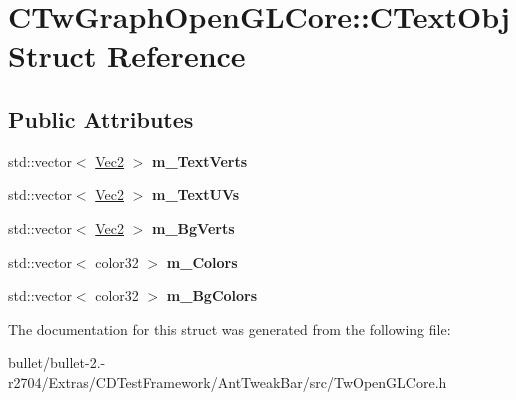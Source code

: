 \hypertarget{struct_c_tw_graph_open_g_l_core_1_1_c_text_obj}{\section{C\+Tw\+Graph\+Open\+G\+L\+Core\+:\+:C\+Text\+Obj Struct Reference}
\label{struct_c_tw_graph_open_g_l_core_1_1_c_text_obj}
}
\subsection*{Public Attributes}
\begin{DoxyCompactItemize}
\item 
\hypertarget{struct_c_tw_graph_open_g_l_core_1_1_c_text_obj_aa15c8ec456b38a1c9b9f0af69ea077cc}{std\+::vector$<$ \hyperlink{struct_c_tw_graph_open_g_l_core_1_1_vec2}{Vec2} $>$ {\bfseries m\+\_\+\+Text\+Verts}}\label{struct_c_tw_graph_open_g_l_core_1_1_c_text_obj_aa15c8ec456b38a1c9b9f0af69ea077cc}

\item 
\hypertarget{struct_c_tw_graph_open_g_l_core_1_1_c_text_obj_a66f623f31f64801c4f2f00548f482166}{std\+::vector$<$ \hyperlink{struct_c_tw_graph_open_g_l_core_1_1_vec2}{Vec2} $>$ {\bfseries m\+\_\+\+Text\+U\+Vs}}\label{struct_c_tw_graph_open_g_l_core_1_1_c_text_obj_a66f623f31f64801c4f2f00548f482166}

\item 
\hypertarget{struct_c_tw_graph_open_g_l_core_1_1_c_text_obj_aaff4dbf9f1e0baff10e7467429592949}{std\+::vector$<$ \hyperlink{struct_c_tw_graph_open_g_l_core_1_1_vec2}{Vec2} $>$ {\bfseries m\+\_\+\+Bg\+Verts}}\label{struct_c_tw_graph_open_g_l_core_1_1_c_text_obj_aaff4dbf9f1e0baff10e7467429592949}

\item 
\hypertarget{struct_c_tw_graph_open_g_l_core_1_1_c_text_obj_afab0b878d25375e1a472453a3f8241bf}{std\+::vector$<$ color32 $>$ {\bfseries m\+\_\+\+Colors}}\label{struct_c_tw_graph_open_g_l_core_1_1_c_text_obj_afab0b878d25375e1a472453a3f8241bf}

\item 
\hypertarget{struct_c_tw_graph_open_g_l_core_1_1_c_text_obj_a52dd872d3a862d9369b023c68ddc4577}{std\+::vector$<$ color32 $>$ {\bfseries m\+\_\+\+Bg\+Colors}}\label{struct_c_tw_graph_open_g_l_core_1_1_c_text_obj_a52dd872d3a862d9369b023c68ddc4577}

\end{DoxyCompactItemize}


The documentation for this struct was generated from the following file\+:\begin{DoxyCompactItemize}
\item 
bullet/bullet-\/2.-\/r2704/\+Extras/\+C\+D\+Test\+Framework/\+Ant\+Tweak\+Bar/src/Tw\+Open\+G\+L\+Core.\+h\end{DoxyCompactItemize}
